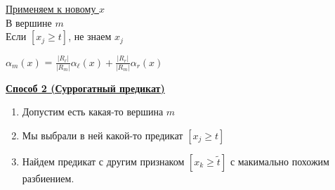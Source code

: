             \underline{Применяем к новому $x$}\\

            В вершине $m$\\

            Если $[x_j \geq t]$, не знаем $x_j$\\
            \begin{center}
                $\alpha_m(x)$ = $\frac{|R_\ell|}{|R_m|}\alpha_\ell(x) + \frac{|R_r|}{|R_m|}\alpha_r(x)$
            \end{center}

            \underline{\textbf{Способ 2 (Суррогатный предикат)}}\\
            \begin{enumerate}
                \item Допустим есть какая-то вершина $m$
                \item Мы выбрали в ней какой-то предикат $[x_j \geq t]$
                \item Найдем предикат с другим признаком $[x_k \geq \tilde{t}]$ с макимально похожим разбиением.
            \end{enumerate}


